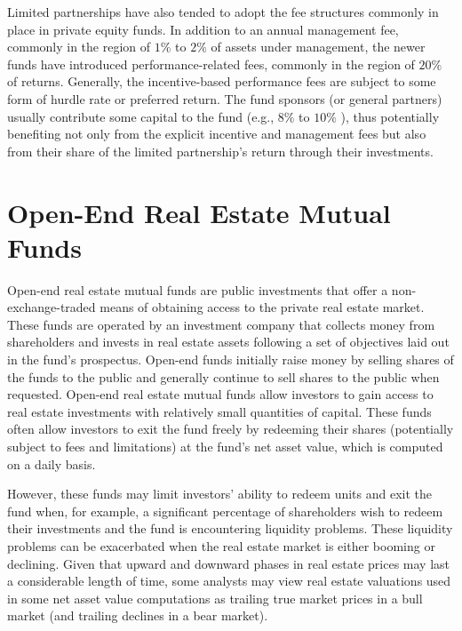 \documentclass[11pt]{article}
\begin{document}
Limited partnerships have also tended to adopt the fee structures commonly in place in private equity funds. In addition to an annual management fee, commonly in the region of $1 \%$ to $2 \%$ of assets under management, the newer funds have introduced performance-related fees, commonly in the region of $20 \%$ of returns. Generally, the incentive-based performance fees are subject to some form of hurdle rate or preferred return. The fund sponsors (or general partners) usually contribute some capital to the fund (e.g., $8 \%$ to $10 \%$ ), thus potentially benefiting not only from the explicit incentive and management fees but also from their share of the limited partnership's return through their investments.

\section*{Open-End Real Estate Mutual Funds}
Open-end real estate mutual funds are public investments that offer a non-exchange-traded means of obtaining access to the private real estate market. These funds are operated by an investment company that collects money from shareholders and invests in real estate assets following a set of objectives laid out in the fund's prospectus. Open-end funds initially raise money by selling shares of the funds to the public and generally continue to sell shares to the public when requested. Open-end real estate mutual funds allow investors to gain access to real estate investments with relatively small quantities of capital. These funds often allow investors to exit the fund freely by redeeming their shares (potentially subject to fees and limitations) at the fund's net asset value, which is computed on a daily basis.

However, these funds may limit investors' ability to redeem units and exit the fund when, for example, a significant percentage of shareholders wish to redeem their investments and the fund is encountering liquidity problems. These liquidity problems can be exacerbated when the real estate market is either booming or declining. Given that upward and downward phases in real estate prices may last a considerable length of time, some analysts may view real estate valuations used in some net asset value computations as trailing true market prices in a bull market (and trailing declines in a bear market).
\end{document}
